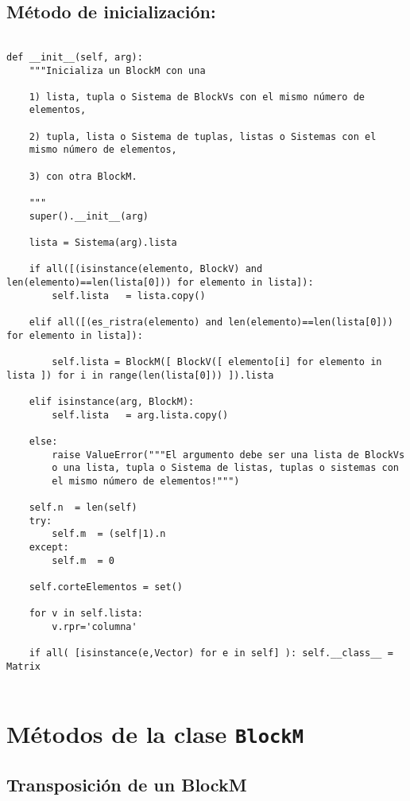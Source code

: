 \documentclass[11pt]{report}
\begin{document}
\subsection{Método de inicialización:}
\label{sec:orge54ea46}

\begin{verbatim}

def __init__(self, arg):
    """Inicializa un BlockM con una

    1) lista, tupla o Sistema de BlockVs con el mismo número de
    elementos,
    
    2) tupla, lista o Sistema de tuplas, listas o Sistemas con el
    mismo número de elementos,
    
    3) con otra BlockM.

    """
    super().__init__(arg)
    
    lista = Sistema(arg).lista
    
    if all([(isinstance(elemento, BlockV) and len(elemento)==len(lista[0])) for elemento in lista]):
        self.lista   = lista.copy()

    elif all([(es_ristra(elemento) and len(elemento)==len(lista[0])) for elemento in lista]):

        self.lista = BlockM([ BlockV([ elemento[i] for elemento in lista ]) for i in range(len(lista[0])) ]).lista

    elif isinstance(arg, BlockM):
        self.lista   = arg.lista.copy()

    else: 
        raise ValueError("""El argumento debe ser una lista de BlockVs
        o una lista, tupla o Sistema de listas, tuplas o sistemas con
        el mismo número de elementos!""")
    
    self.n  = len(self)
    try: 
        self.m  = (self|1).n
    except:
        self.m  = 0
            
    self.corteElementos = set()
   
    for v in self.lista:
        v.rpr='columna'
        
    if all( [isinstance(e,Vector) for e in self] ): self.__class__ = Matrix
    
\end{verbatim}

\section{Métodos de la clase \texttt{BlockM}}
\label{sec:org121514c}
\subsection{Transposición de un BlockM}
\label{sec:orge96bd79}
\end{document}
